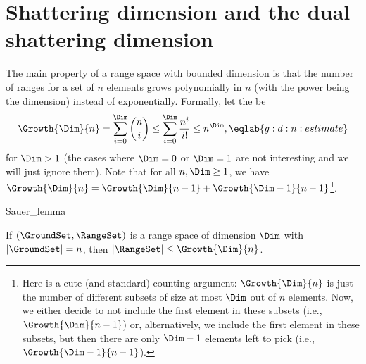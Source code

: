 \section{Shattering dimension and %
   the dual shattering dimension}

The main property of a range space with bounded \VC dimension is that
the number of ranges for a set of $n$ elements grows polynomially in
$n$ (with the power being the dimension) instead of exponentially.
Formally, let the  be
\begin{equation}
    \Growth{\Dim}{n} = \sum_{i=0}^{\Dim} \binom{n}{i}
    \leq \sum_{i=0}^{\Dim} \frac{n^i}{i!}
    \leq n^\Dim,
    \eqlab{g:d:n:estimate}
\end{equation}
for $\Dim>1$ (the cases where $\Dim=0$ or $\Dim=1$ are not interesting
and we will just ignore them).  Note that for all $n,\Dim \geq 1$, we
have $\Growth{\Dim}{n} = \Growth{\Dim}{n-1} +
\Growth{\Dim-1}{n-1}$\footnote{Here is a cute (and standard) counting
   argument: $\Growth{\Dim}{n}$ is just the number of different
   subsets of size at most $\Dim$ out of $n$ elements. Now, we either
   decide to not include the first element in these subsets (i.e.,
   $\Growth{\Dim}{n-1}$) or, alternatively, we include the first
   element in these subsets, but then there are only $\Dim-1$ elements
   left to pick (i.e., $\Growth{\Dim-1}{n-1}$).}.

\begin{fragment}{Sauer_lemma}
    \begin{lemma}
        If $(\GroundSet,\RangeSet)$ is a range space of \VC dimension
        $\Dim$ with $|\GroundSet| = n$, then $|\RangeSet| \leq
        \Growth{\Dim}{n}$.        
    \end{lemma}
\end{fragment}

